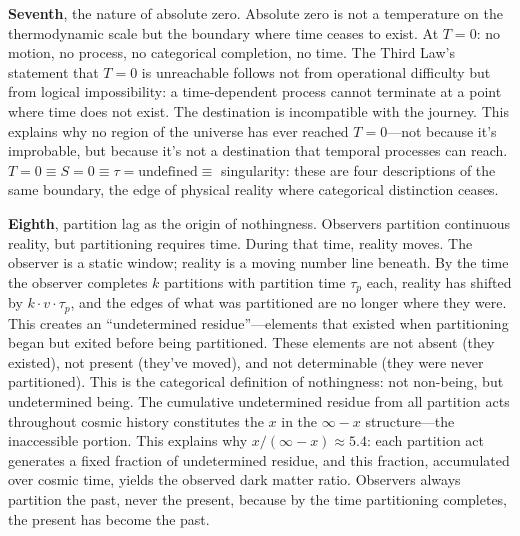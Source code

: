\documentclass[12pt,a4paper]{article}
\theoremstyle{definition}
\theoremstyle{remark}
\begin{document}
\textbf{Seventh}, the nature of absolute zero. Absolute zero is not a temperature on the thermodynamic scale but the boundary where time ceases to exist. At $T = 0$: no motion, no process, no categorical completion, no time. The Third Law's statement that $T = 0$ is unreachable follows not from operational difficulty but from logical impossibility: a time-dependent process cannot terminate at a point where time does not exist. The destination is incompatible with the journey. This explains why no region of the universe has ever reached $T = 0$---not because it's improbable, but because it's not a destination that temporal processes can reach. $T = 0 \equiv S = 0 \equiv \tau = \text{undefined} \equiv$ singularity: these are four descriptions of the same boundary, the edge of physical reality where categorical distinction ceases.

\textbf{Eighth}, partition lag as the origin of nothingness. Observers partition continuous reality, but partitioning requires time. During that time, reality moves. The observer is a static window; reality is a moving number line beneath. By the time the observer completes $k$ partitions with partition time $\tau_p$ each, reality has shifted by $k \cdot v \cdot \tau_p$, and the edges of what was partitioned are no longer where they were. This creates an ``undetermined residue''---elements that existed when partitioning began but exited before being partitioned. These elements are not absent (they existed), not present (they've moved), and not determinable (they were never partitioned). This is the categorical definition of nothingness: not non-being, but undetermined being. The cumulative undetermined residue from all partition acts throughout cosmic history constitutes the $x$ in the $\infty - x$ structure---the inaccessible portion. This explains why $x/(\infty - x) \approx 5.4$: each partition act generates a fixed fraction of undetermined residue, and this fraction, accumulated over cosmic time, yields the observed dark matter ratio. Observers always partition the past, never the present, because by the time partitioning completes, the present has become the past.
\end{document}
